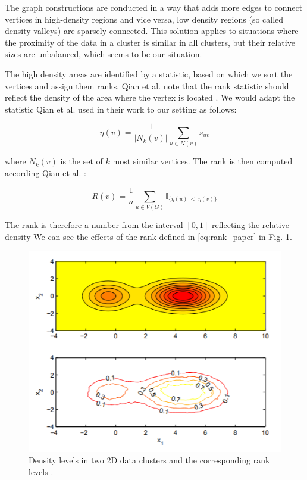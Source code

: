 The graph constructions are conducted in a way that adds more edges to connect vertices in high-density regions and vice versa, low density regions (so called density valleys) are sparsely connected. This solution applies to situations where the proximity of the data in a cluster is similar in all clusters, but their relative sizes are unbalanced, which seems to be our situation.

The high density areas are identified by a statistic, based on which we sort the vertices and assign them ranks. Qian et al. note that the rank statistic should reflect the density of the area where the vertex is located \cite{qian2013spectral}. We would adapt the statistic Qian et al. used in their work to our setting as follows:

\begin{equation}
    \eta(v) = \frac{1}{|N_{k}(v)|} \sum_{u \in N(v)} s_{uv}
\end{equation}

where $N_{k}(v)$ is the set of $k$ most similar vertices. The rank is then computed according Qian et al. \cite{qian2013spectral}:

\begin{equation}
    R(v) = \frac{1}{n} \sum_{u \in V(G)} \mathbb{I}_{\{ \eta(u) ~<~ \eta(v) \}}
    \label{eq:rank_paper}
\end{equation}

The rank is therefore a number from the interval $[0, 1]$ reflecting the relative density  We can see the effects of the rank defined in \ref{eq:rank_paper} in Fig. \ref{fig:density_levels}.

\begin{figure}
    \centering
    \includegraphics{images/density_levels.png}
    \caption[Density levels]{Density levels in two 2D data clusters and the corresponding rank levels \cite{qian2013spectral}.}
    \label{fig:density_levels}
\end{figure}

